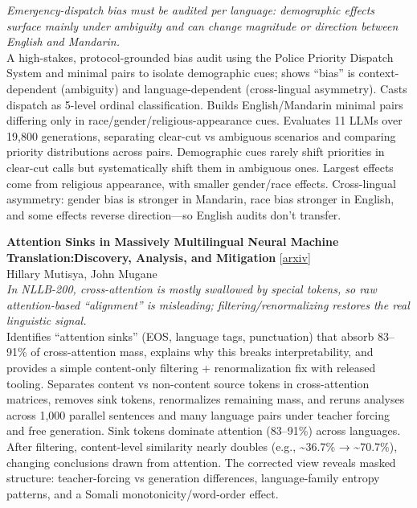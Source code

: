 \documentclass[12pt,letterpaper]{article}
\begin{document}
{\small\textit{Emergency-dispatch bias must be audited per language: demographic effects surface mainly under ambiguity and can change magnitude or direction between English and Mandarin.}}\\[1pt]
{\footnotesize A high-stakes, protocol-grounded bias audit using the Police Priority Dispatch System and minimal pairs to isolate demographic cues; shows ``bias'' is context-dependent (ambiguity) and language-dependent (cross-lingual asymmetry). Casts dispatch as 5-level ordinal classification. Builds English/Mandarin minimal pairs differing only in race/gender/religious-appearance cues. Evaluates 11 LLMs over 19,800 generations, separating clear-cut vs ambiguous scenarios and comparing priority distributions across pairs. Demographic cues rarely shift priorities in clear-cut calls but systematically shift them in ambiguous ones. Largest effects come from religious appearance, with smaller gender/race effects. Cross-lingual asymmetry: gender bias is stronger in Mandarin, race bias stronger in English, and some effects reverse direction---so English audits don't transfer.}

\medskip

{\small\textbf{Attention Sinks in Massively Multilingual Neural Machine Translation:Discovery, Analysis, and Mitigation}} {\scriptsize[\href{https://arxiv.org/abs/2605.01229}{arxiv}]}\\
{\scriptsize Hillary Mutisya, John Mugane}\\

{\small\textit{In NLLB-200, cross-attention is mostly swallowed by special tokens, so raw attention-based ``alignment'' is misleading; filtering/renormalizing restores the real linguistic signal.}}\\[1pt]
{\footnotesize Identifies ``attention sinks'' (EOS, language tags, punctuation) that absorb 83--91\% of cross-attention mass, explains why this breaks interpretability, and provides a simple content-only filtering + renormalization fix with released tooling. Separates content vs non-content source tokens in cross-attention matrices, removes sink tokens, renormalizes remaining mass, and reruns analyses across 1,000 parallel sentences and many language pairs under teacher forcing and free generation. Sink tokens dominate attention (83--91\%) across languages. After filtering, content-level similarity nearly doubles (e.g., \textasciitilde{}36.7\% → \textasciitilde{}70.7\%), changing conclusions drawn from attention. The corrected view reveals masked structure: teacher-forcing vs generation differences, language-family entropy patterns, and a Somali monotonicity/word-order effect.}
\end{document}

